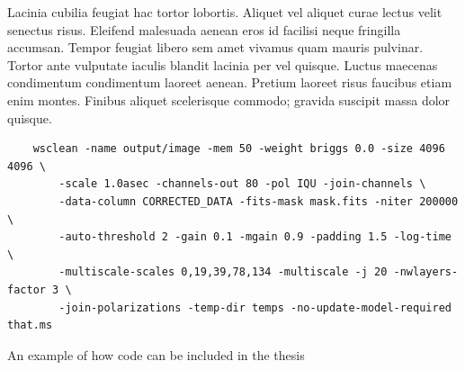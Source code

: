Lacinia cubilia feugiat hac tortor lobortis. Aliquet vel aliquet curae lectus velit senectus risus. Eleifend malesuada aenean eros id facilisi neque fringilla accumsan. Tempor feugiat libero sem amet vivamus quam mauris pulvinar. Tortor ante vulputate iaculis blandit lacinia per vel quisque. Luctus maecenas condimentum condimentum laoreet aenean. Pretium laoreet risus faucibus etiam enim montes. Finibus aliquet scelerisque commodo; gravida suscipit massa dolor quisque.

\begin{listing}[H]
\begin{verbatim}
    wsclean -name output/image -mem 50 -weight briggs 0.0 -size 4096 4096 \
        -scale 1.0asec -channels-out 80 -pol IQU -join-channels \
        -data-column CORRECTED_DATA -fits-mask mask.fits -niter 200000 \
        -auto-threshold 2 -gain 0.1 -mgain 0.9 -padding 1.5 -log-time \
        -multiscale-scales 0,19,39,78,134 -multiscale -j 20 -nwlayers-factor 3 \
        -join-polarizations -temp-dir temps -no-update-model-required that.ms 
\end{verbatim}
\caption{An example of how code can be included in the thesis}
\label{lst:some-wsclean}
\end{listing}